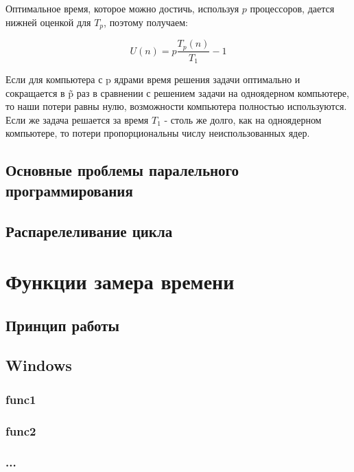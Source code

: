 \documentclass{article}
\begin{document}
				Оптимальное время, которое можно достичь, используя $p$ процессоров, дается нижней оценкой для $T_p$, 							поэтому получаем:	

			\begin{equation}
				\label{eq:loss_of_efficiency_second}
				U(n) = p\frac{T_p(n)}{T_1} - 1
			\end{equation}
				
				Если для компьютера с p ядрами время решения задачи оптимально и сокращается в \~p раз в сравнении с решением 					задачи на одноядерном компьютере, то наши потери равны нулю, возможности компьютера полностью используются. Если же 				задача решается за время $T_1$ - столь же долго, как на одноядерном компьютере, то потери пропорциональны числу 					неиспользованных ядер.
				
		\subsection{Основные проблемы паралельного программирования}
		\subsection{Распарелеливание цикла}
	\newpage
	\section{Функции замера времени}
		\subsection{Принцип работы}
		\subsection{Windows}
			\subsubsection{func1}
			\subsubsection{func2}
			\subsubsection{...}
\end{document}
